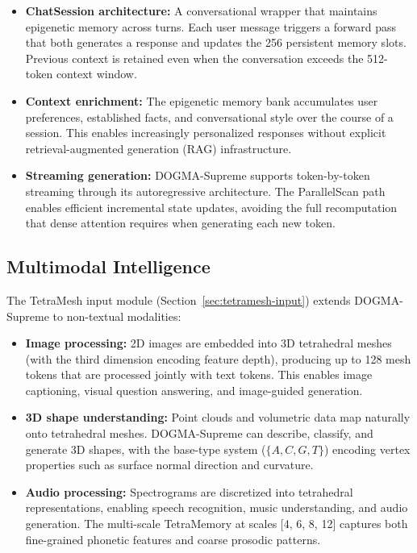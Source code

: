\begin{itemize}[leftmargin=1.8em]
  \item \textbf{ChatSession architecture:} A conversational wrapper that maintains epigenetic memory across turns. Each user message triggers a forward pass that both generates a response and updates the 256 persistent memory slots. Previous context is retained even when the conversation exceeds the 512-token context window.
  \item \textbf{Context enrichment:} The epigenetic memory bank accumulates user preferences, established facts, and conversational style over the course of a session. This enables increasingly personalized responses without explicit retrieval-augmented generation (RAG) infrastructure.
  \item \textbf{Streaming generation:} DOGMA-Supreme supports token-by-token streaming through its autoregressive architecture. The ParallelScan path enables efficient incremental state updates, avoiding the full recomputation that dense attention requires when generating each new token.
\end{itemize}

\subsection{Multimodal Intelligence}
\label{sec:app-multimodal}

The TetraMesh input module (Section~\ref{sec:tetramesh-input}) extends DOGMA-Supreme to non-textual modalities:

\begin{itemize}[leftmargin=1.8em]
  \item \textbf{Image processing:} 2D images are embedded into 3D tetrahedral meshes (with the third dimension encoding feature depth), producing up to 128 mesh tokens that are processed jointly with text tokens. This enables image captioning, visual question answering, and image-guided generation.
  \item \textbf{3D shape understanding:} Point clouds and volumetric data map naturally onto tetrahedral meshes. DOGMA-Supreme can describe, classify, and generate 3D shapes, with the base-type system ($\{A, C, G, T\}$) encoding vertex properties such as surface normal direction and curvature.
  \item \textbf{Audio processing:} Spectrograms are discretized into tetrahedral representations, enabling speech recognition, music understanding, and audio generation. The multi-scale TetraMemory at scales [4, 6, 8, 12] captures both fine-grained phonetic features and coarse prosodic patterns.
\end{itemize}

